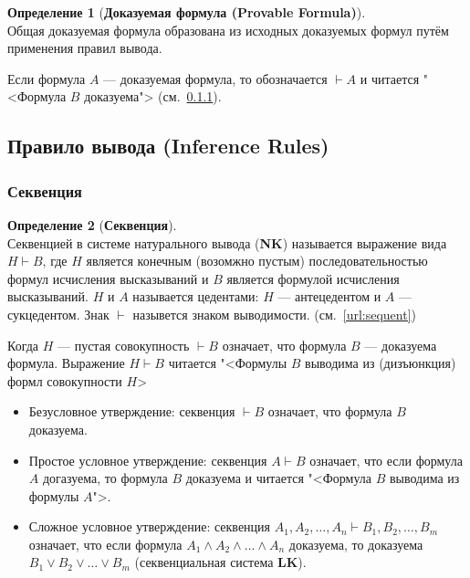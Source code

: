\documentclass[fleqn,11pt]{article}
\theoremstyle{definition}
\newtheorem{definition}{Определение}
\begin{document}
\begin{definition}[\textbf{Доказуемая формула (Provable Formula)}] ~\\
 	Общая доказуемая формула образована из исходных доказуемых формул путём применения правил вывода.
\end{definition}
Если формула $A$ \cdash--- доказуемая формула, то обозначается $\vdash A$ и читается
"<Формула $B$ доказуема"> (см.~\ref{sec:sequent}).

\subsection{Правило вывода (Inference Rules)}

\subsubsection{Секвенция}\label{sec:sequent}

\begin{definition}[\textbf{Секвенция}] ~\\
	Секвенцией в системе натурального вывода (\textbf{NK}) называется выражение вида $H \vdash B$, где
	$H$ является конечным (возомжно пустым) последовательностью формул исчисления высказываний и $B$
	является формулой исчисления высказываний. $H$ и $A$ называется цедентами: $H$ \cdash--- антецедентом и
	$A$ \cdash--- сукцедентом. Знак $\vdash$ назывется знаком выводимости.
	(см.~\ref{url:sequent})
\end{definition}
Когда $H$ \cdash--- пустая совокупность $\vdash B$ означает, что формула $B$ \cdash--- доказуема формула.
Выражение $H \vdash B$ читается "<Формулы $B$ выводима из (дизъюнкция) формл совокупности $H$>

\begin{itemize}
	\item Безусловное утверждение: секвенция $\vdash B$ означает, что формула $B$ доказуема.
	\item Простое условное утверждение: секвенция $A \vdash B$ означает, что если формула $A$ догазуема,
		    то формула $B$ доказуема и читается "<Формула $B$ выводима из формулы $A$">.
	\item Сложное условное утверждение: секвенция $A_1, A_2, \dots, A_n \vdash B_1, B_2, \dots, B_m$ означает,
				что если формула $A_1 \land A_2 \land \dots \land A_n$ доказуема, то доказуема
				$B_1 \lor B_2 \lor \dots \lor B_m$ (секвенциальная система \textbf{LK}).
\end{itemize}
\end{document}
